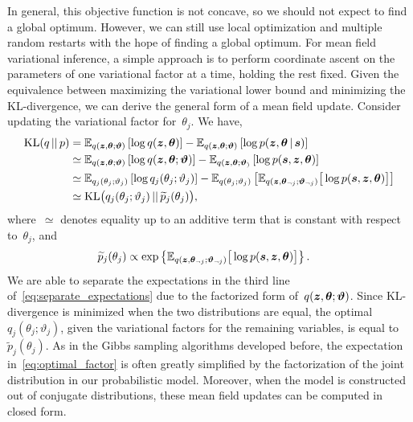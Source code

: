 In general, this objective function is not concave, so we should not
expect to find a global optimum. However, we can still use local
optimization and multiple random restarts with the hope of finding a
global optimum.  For mean field variational inference, a simple
approach is to perform coordinate ascent on the parameters of one
variational factor at a time, holding the rest fixed. Given the
equivalence between maximizing the variational lower bound and
minimizing the KL-divergence, we can derive the general form of a mean
field update. Consider updating the variational factor
for~$\theta_j$. We have,
\begin{align}
  \nonumber
  \mathrm{KL}(q {\,||\,} p) 
  &= \mathbb{E}_{q(\boldsymbol{z}, \boldsymbol{\theta}; \boldsymbol{\vartheta})} \left[ \log q(\boldsymbol{z}, \boldsymbol{\theta}) \right] 
  - \mathbb{E}_{q(\boldsymbol{z}, \boldsymbol{\theta}; \boldsymbol{\vartheta})} \left[ \log p(\boldsymbol{z}, \boldsymbol{\theta} \,|\, \boldsymbol{s}) \right] \\
  \nonumber
  &\simeq \mathbb{E}_{q(\boldsymbol{z}, \boldsymbol{\theta}; \boldsymbol{\vartheta})} \left[ \log q(\boldsymbol{z}, \boldsymbol{\theta}; \boldsymbol{\vartheta}) \right] 
  - \mathbb{E}_{q(\boldsymbol{z}, \boldsymbol{\theta}; \boldsymbol{\vartheta}_)} \left[ \log p(\boldsymbol{s}, \boldsymbol{z}, \boldsymbol{\theta}) \right]  \\
  \nonumber
  &\simeq \mathbb{E}_{q_j(\theta_j; \vartheta_j)} \left[ \log q_j(\theta_j ; \vartheta_j) \right] 
  - \mathbb{E}_{q(\theta_j; \vartheta_j)} \left[ \mathbb{E}_{q(\boldsymbol{z}, \boldsymbol{\theta}_{\neg j} ; \boldsymbol{\vartheta}_{\neg j})} \big[ \log p(\boldsymbol{s}, \boldsymbol{z}, \boldsymbol{\theta}) \big] \right] \\
  \label{eq:separate_expectations}
  &\simeq \mathrm{KL} \big( q_j(\theta_j; \vartheta_j) {\,||\,} \widetilde{p}_j(\theta_j) \big),
\end{align}
where~$\simeq$ denotes equality up to an additive term that is
constant with respect to~$\theta_j$, and
\begin{align}
  \label{eq:optimal_factor}
  \widetilde{p}_j(\theta_j) 
  &\propto \exp \left \{ \mathbb{E}_{q(\boldsymbol{z}, \boldsymbol{\theta}_{\neg j} ; \boldsymbol{\vartheta}_{\neg j})} \big[ \log p(\boldsymbol{s}, \boldsymbol{z}, \boldsymbol{\theta}) \big] \right \}.
\end{align}
We are able to separate the expectations in the third line 
of~\eqref{eq:separate_expectations} due to the factorized form
of~$q(\boldsymbol{z}, \boldsymbol{\theta}; \boldsymbol{\vartheta})$.
Since KL-divergence is minimized when the two
distributions are equal, the optimal~$q_j(\theta_j; \vartheta_j)$, given the
variational factors for the remaining variables, is equal
to~$\widetilde{p}_j(\theta_j)$.  As in the Gibbs sampling algorithms
developed before, the expectation in~\eqref{eq:optimal_factor} is
often greatly simplified by the factorization of the joint
distribution in our probabilistic model. Moreover, when the model 
is constructed out of conjugate distributions, these mean field 
updates can be computed in closed form.

